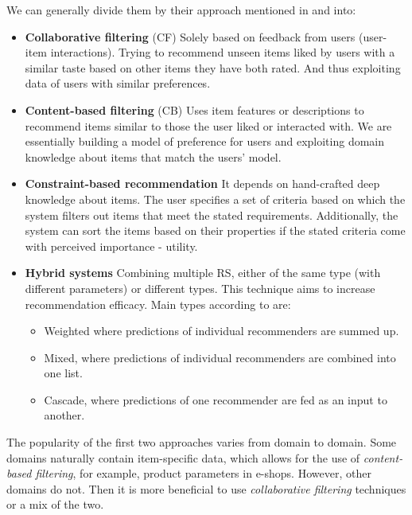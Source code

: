 We can generally divide them by their approach mentioned in \cite{RS_handbook-ricci2011} and \cite{constraint_based_recommenders} into:
\begin{itemize}
    \item \textbf{Collaborative filtering} (CF)\newline
        Solely based on feedback from users (user-item interactions). Trying to recommend unseen items liked by users with a similar taste based on other items they have both rated. And thus exploiting data of users with similar preferences.
    \item  \textbf{Content-based filtering} (CB)\newline
        Uses item features or descriptions to recommend items similar to those the user liked or interacted with. We are essentially building a model of preference for users and exploiting domain knowledge about items that match the users' model.
    \item \textbf{Constraint-based recommendation}\newline
        It depends on hand-crafted deep knowledge about items. The user specifies a set of criteria based on which the system filters out items that meet the stated requirements. Additionally, the system can sort the items based on their properties if the stated criteria come with perceived importance - utility.
    \item \textbf{Hybrid systems}\newline    
        Combining multiple RS, either of the same type (with different parameters) or different types. This technique aims to increase recommendation efficacy. Main types according to \cite{grouprecommendersystems_felfernig2018group} are:
        \begin{itemize}
            \item Weighted where predictions of individual recommenders are summed up.
            \item Mixed, where predictions of individual recommenders are combined into one list.
            \item Cascade, where predictions of one recommender are fed as an input to another.
        \end{itemize}
\end{itemize}

The popularity of the first two approaches varies from domain to domain. Some domains naturally contain item-specific data, which allows for the use of \textit{content-based filtering}, for example, product parameters in e-shops. However, other domains do not. Then it is more beneficial to use \textit{collaborative filtering} techniques or a mix of the two.

